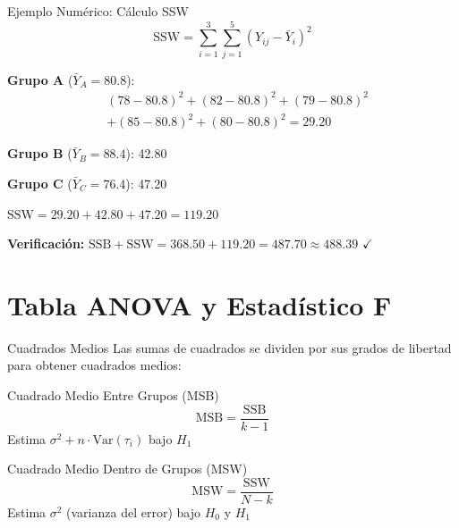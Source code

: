 \documentclass[10pt,aspectratio=169]{beamer}
\begin{document}
\begin{frame}{Ejemplo Numérico: Cálculo SSW}
\begin{equation*}
\text{SSW} = \sum_{i=1}^{3} \sum_{j=1}^{5} (Y_{ij} - \bar{Y}_i)^2
\end{equation*}

\vspace{0.3cm}

\textbf{Grupo A} ($\bar{Y}_A = 80.8$):
\begin{align*}
&(78-80.8)^2 + (82-80.8)^2 + (79-80.8)^2 \\
&+ (85-80.8)^2 + (80-80.8)^2 = 29.20
\end{align*}

\textbf{Grupo B} ($\bar{Y}_B = 88.4$): 42.80

\textbf{Grupo C} ($\bar{Y}_C = 76.4$): 47.20

\vspace{0.3cm}
\alert{$\text{SSW} = 29.20 + 42.80 + 47.20 = 119.20$}

\vspace{0.3cm}
\textbf{Verificación:} $\text{SSB} + \text{SSW} = 368.50 + 119.20 = 487.70 \approx 488.39$ $\checkmark$
\end{frame}

\section{Tabla ANOVA y Estadístico F}

\begin{frame}{Cuadrados Medios}
Las sumas de cuadrados se dividen por sus grados de libertad para obtener \alert{cuadrados medios}:

\vspace{0.5cm}

\begin{block}{Cuadrado Medio Entre Grupos (MSB)}
\begin{equation*}
\text{MSB} = \frac{\text{SSB}}{k-1}
\end{equation*}
Estima $\sigma^2 + n \cdot \text{Var}(\tau_i)$ bajo $H_1$
\end{block}

\vspace{0.3cm}

\begin{block}{Cuadrado Medio Dentro de Grupos (MSW)}
\begin{equation*}
\text{MSW} = \frac{\text{SSW}}{N-k}
\end{equation*}
Estima $\sigma^2$ (varianza del error) bajo $H_0$ y $H_1$
\end{block}
\end{frame}
\end{document}
